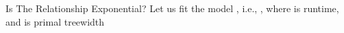 \documentclass{beamer}
\begin{document}
\begin{frame}{Is The Relationship Exponential?}
  Let us fit the model , i.e.,
  , where  is
  \alert{runtime}, and  is \alert{primal treewidth}
  \begin{overprint}%
  \end{overprint}
\end{frame}
\end{document}
